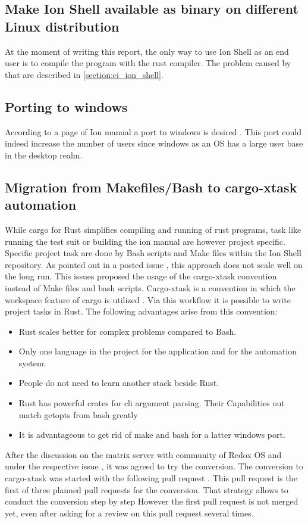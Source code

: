 \subsection{Make Ion Shell available as binary on different Linux distribution}

At the moment of writing this report,
the only way to use Ion Shell as an end user is to compile the program with the rust compiler.
The problem caused by that are described in \ref{section:ci_ion_shell}.

\subsection{Porting to windows}

According to a page of Ion manual a port to windows is desired \cite{ion_manual_instroduction}.
This port could indeed increase the number of users since windows
as an OS has a large user base in the desktop realm.

\subsection{Migration from Makefiles/Bash to cargo-xtask automation}

While cargo for Rust simplifies compiling and running of rust programs,
task like running the test suit or building the ion manual are however project specific.
Specific project task are done by Bash scripts and Make files within the Ion Shell repository.
As pointed out in a posted issue \cite{issue_convert_make_files_to_xtask},
this approach does not scale well on the long run.
This issues proposed the usage of the cargo-xtask convention instead of Make files and bash scripts.
Cargo-xtask is a convention in which the workspace feature of cargo is utilized \cite{repos_cargo_xtask}.
Via this workflow it is possible to write project tasks in Rust.
The following advantages arise from this convention:
\begin{itemize}
	\item Rust scales better for complex problems compared to Bash.
	\item Only one language in the project for the application and for the automation system.
	\item People do not need to learn another stack beside Rust.
	\item Rust has powerful crates for cli argument parsing. Their Capabilities out match getopts from bash greatly
	\item It is advantageous to get rid of make and bash for a latter windows port.
\end{itemize}

After the discussion on the matrix server with community of Redox OS and under the respective issue
\cite{issue_convert_make_files_to_xtask}, it was agreed to try the conversion.
The conversion to cargo-xtask was started with the following pull request \cite{pr_still_opened_cargo_xtask}.
This pull request is the first of three planned pull requests for the conversion.
That strategy allows to conduct the conversion step by step
However the first pull request is not  merged yet,
even after asking for a review on this pull request several times.



